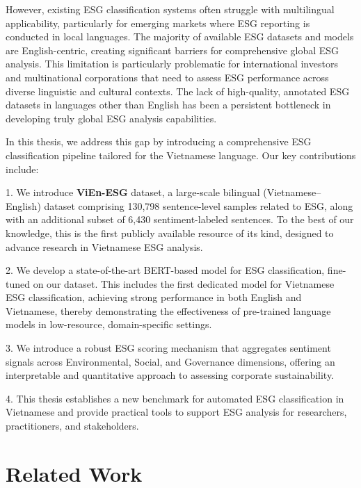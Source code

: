 \documentclass[12pt, letterpaper]{template}
\begin{document}
However, existing ESG classification systems often struggle with multilingual applicability, particularly for emerging markets where ESG reporting is conducted in local languages. The majority of available ESG datasets and models are English-centric, creating significant barriers for comprehensive global ESG analysis. This limitation is particularly problematic for international investors and multinational corporations that need to assess ESG performance across diverse linguistic and cultural contexts. The lack of high-quality, annotated ESG datasets in languages other than English has been a persistent bottleneck in developing truly global ESG analysis capabilities.

In this thesis, we address this gap by introducing a comprehensive ESG classification pipeline tailored for the Vietnamese language. Our key contributions include:

1. We introduce \textbf{ViEn-ESG} dataset, a large-scale bilingual (Vietnamese–English) dataset comprising 130,798 sentence-level samples related to ESG, along with an additional subset of 6,430 sentiment-labeled sentences. To the best of our knowledge, this is the first publicly available resource of its kind, designed to advance research in Vietnamese ESG analysis.

2. We develop a state-of-the-art BERT-based model for ESG classification, fine-tuned on our dataset. This includes the first dedicated model for Vietnamese ESG classification, achieving strong performance in both English and Vietnamese, thereby demonstrating the effectiveness of pre-trained language models in low-resource, domain-specific settings.

3. We introduce a robust ESG scoring mechanism that aggregates sentiment signals across Environmental, Social, and Governance dimensions, offering an interpretable and quantitative approach to assessing corporate sustainability.

4. This thesis establishes a new benchmark for automated ESG classification in Vietnamese and provide practical tools to support ESG analysis for researchers, practitioners, and stakeholders.

\section{Related Work}
\end{document}
